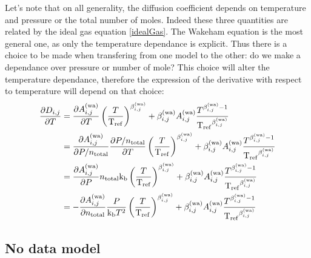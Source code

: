 %
Let's note that on all generality, the diffusion coefficient depends
on temperature and pressure or the total number of moles. Indeed these
three quantities are related by the ideal gas equation \eqref{idealGas}. The
Wakeham equation is the most general one, as only the temperature dependance
is explicit. Thus there is a choice to be made when transfering from one
model to the other: do we make a dependance over pressure or number of mole?
This choice will alter the temperature dependance, therefore the expression of
the derivative
with respect to temperature will depend on that choice:
\begin{equation}
\begin{split}
\frac{\partial D_{i,j}}{\partial T}  & = \frac{\partial A_{i,j}^{\text{(wa)}}}{\partial T} \left(\frac{T}{\mathrm{T_{ref}}}\right)^{\beta_{i,j}^{\text{(wa)}}} + \beta_{i,j}^{\text{(wa)}}A_{i,j}^{\text{(wa)}}\frac{T^{\beta_{i,j}^{\text{(wa)}} - 1}}{\mathrm{T_{ref}}^{\beta_{i,j}^{\text{(wa)}}}} \\
                         & = \frac{\partial A_{i,j}^{\text{(wa)}}}{\partial P/n_\text{total}}\frac{\partial P/n_\text{total}}{\partial T} \left(\frac{T}{\mathrm{T_{ref}}}\right)^{\beta_{i,j}^{\text{(wa)}}} + \beta_{i,j}^{\text{(wa)}}A_{i,j}^{\text{(wa)}}\frac{T^{\beta_{i,j}^{\text{(wa)}} - 1}}{\mathrm{T_{ref}}^{\beta_{i,j}^{\text{(wa)}}}} \\
                         & = \frac{\partial A_{i,j}^{\text{(wa)}}}{\partial P}n_\text{total}\text{k}_\text{b} \left(\frac{T}{\mathrm{T_{ref}}}\right)^{\beta_{i,j}^{\text{(wa)}}} + \beta_{i,j}^{\text{(wa)}}A_{i,j}^{\text{(wa)}}\frac{T^{\beta_{i,j}^{\text{(wa)}} - 1}}{\mathrm{T_{ref}}^{\beta_{i,j}^{\text{(wa)}}}} \\
                         & = - \frac{\partial A_{i,j}^{\text{(wa)}}}{\partial n_\text{total}}\frac{P}{\text{k}_\text{b} T^2} \left(\frac{T}{\mathrm{T_{ref}}}\right)^{\beta_{i,j}^{\text{(wa)}}} + \beta_{i,j}^{\text{(wa)}}A_{i,j}^{\text{(wa)}}\frac{T^{\beta_{i,j}^{\text{(wa)}} - 1}}{\mathrm{T_{ref}}^{\beta_{i,j}^{\text{(wa)}}}} \\
\end{split}
\end{equation}

\subsection{No data model}

